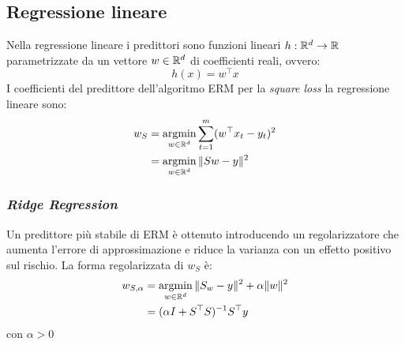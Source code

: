 \subsection{Regressione lineare}
Nella regressione lineare i predittori sono funzioni lineari
$h:\mathbb{R}^d\rightarrow\mathbb{R}$ parametrizzate da un vettore $w\in\mathbb{R}^d$ di
coefficienti reali, ovvero:
$$ h(x) = w^\top x $$
I coefficienti del predittore dell'algoritmo ERM per la \textit{square loss}
la regressione lineare sono:
$$ \begin{aligned}
   w_S &= \operatorname*{argmin}_{w\in\mathbb{R}^d}\sum_{t=1}^{m} (w^\top x_t - y_t)^2\\
   &= \operatorname*{argmin}_{w\in\mathbb{R}^d} \|Sw-y\|^2
   \end{aligned}
$$

\subsubsection{\textit{Ridge Regression}}
Un predittore più stabile di ERM è ottenuto introducendo un regolarizzatore
che aumenta l'errore di approssimazione e riduce la varianza con un effetto
positivo sul rischio. La forma regolarizzata di $w_S$ è:
$$\begin{aligned}
   w_{S,\alpha} &= \operatorname*{argmin}_{w\in\mathbb{R}^d}\|S_w-y\|^2+\alpha\|w\|^2\\
   &= (\alpha I+S^\top S)^{-1}S^\top y
\end{aligned}$$
con $\alpha>0$